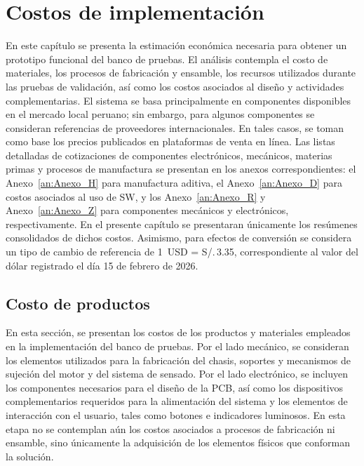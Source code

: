 \chapter{Costos de implementación}
\label{ch:CH08}
\noindent
En este capítulo se presenta la estimación económica necesaria para obtener un prototipo funcional del banco de pruebas. El análisis contempla el costo de materiales, los procesos de fabricación y ensamble, los recursos utilizados durante las pruebas de validación, así como los costos asociados al diseño y actividades complementarias. El sistema se basa principalmente en componentes disponibles en el mercado local peruano; sin embargo, para algunos componentes se consideran referencias de proveedores internacionales. En tales casos, se toman como base los precios publicados en plataformas de venta en línea.
\noindent
Las listas detalladas de cotizaciones de componentes electrónicos, mecánicos, materias primas y procesos de manufactura se presentan en los anexos correspondientes: el Anexo~\ref{an:Anexo_H} para manufactura aditiva, el Anexo~\ref{an:Anexo_D} para costos asociados al uso de \ac{SW}, y los Anexo~\ref{an:Anexo_R} y Anexo~\ref{an:Anexo_Z} para componentes mecánicos y electrónicos, respectivamente. En el presente capítulo se presentaran únicamente los resúmenes consolidados de dichos costos. 
\noindent
Asimismo, para efectos de conversión se considera un tipo de cambio de referencia de 1~USD = S/.\,3.35, correspondiente al valor del dólar registrado el día 15 de febrero de 2026.


\section{Costo de productos}

\noindent
En esta sección, se presentan los costos de los productos y materiales empleados en la implementación del banco de pruebas. Por el lado mecánico, se consideran los elementos utilizados para la fabricación del chasis, soportes y mecanismos de sujeción del motor y del sistema de sensado. Por el lado electrónico, se incluyen los componentes necesarios para el diseño de la \ac{PCB}, así como los dispositivos complementarios requeridos para la alimentación del sistema y los elementos de interacción con el usuario, tales como botones e indicadores luminosos. En esta etapa no se contemplan aún los costos asociados a procesos de fabricación ni ensamble, sino únicamente la adquisición de los elementos físicos que conforman la solución.

